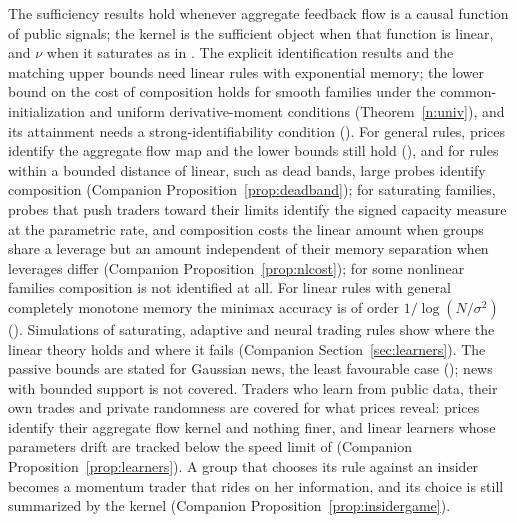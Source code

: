 \documentclass[12pt]{article}
\theoremstyle{definition}
\theoremstyle{remark}
\begin{document}
The sufficiency results hold whenever aggregate feedback flow is a causal function of public signals; the kernel is the sufficient object when that function is linear, and $\nu$ when it saturates as in \citet[Section~S6]{niroula2026full}. The explicit identification results and the matching upper bounds need linear rules with exponential memory; the lower bound on the cost of composition holds for smooth families under the common-initialization and uniform derivative-moment conditions (Theorem~\ref{n:univ}), and its attainment needs a strong-identifiability condition (\citealp[Proposition~S29.1]{niroula2026full}). For general rules, prices identify the aggregate flow map and the lower bounds still hold (\citealp[Theorem~S6.7]{niroula2026full}), and for rules within a bounded distance of linear, such as dead bands, large probes identify composition (Companion Proposition~\ref{prop:deadband}); for saturating families, probes that push traders toward their limits identify the signed capacity measure at the parametric rate, and composition costs the linear amount when groups share a leverage but an amount independent of their memory separation when leverages differ (Companion Proposition~\ref{prop:nlcost}); for some nonlinear families composition is not identified at all. For linear rules with general completely monotone memory the minimax accuracy is of order $1/\log(N/\sigma^2)$ (\citealp[Theorem~S18.2]{niroula2026full}). Simulations of saturating, adaptive and neural trading rules show where the linear theory holds and where it fails (Companion Section~\ref{sec:learners}). The passive bounds are stated for Gaussian news, the least favourable case (\citealp[Proposition~S16.2]{niroula2026full}); news with bounded support is not covered. Traders who learn from public data, their own trades and private randomness are covered for what prices reveal: prices identify their aggregate flow kernel and nothing finer, and linear learners whose parameters drift are tracked below the speed limit of \citet[Theorem~S15.1]{niroula2026full} (Companion Proposition~\ref{prop:learners}). A group that chooses its rule against an insider becomes a momentum trader that rides on her information, and its choice is still summarized by the kernel (Companion Proposition~\ref{prop:insidergame}).
\end{document}
